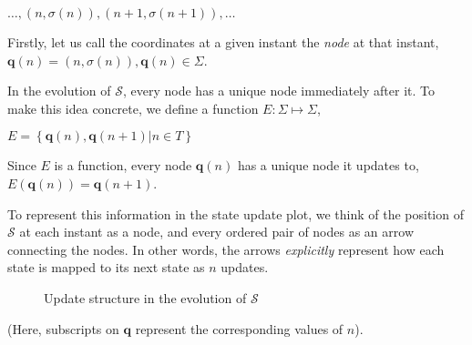 \documentclass[12 pt]{article}
\begin{document}
$\dots, \left( n, \sigma \left( n \right) \right), \left( n+1, \sigma \left( n+1 \right) \right), \dots$

Firstly, let us call the coordinates at a given instant the \emph{node} at that instant, $\pmb{q} \left( n \right) = \left( n, \sigma \left( n \right) \right), \pmb{q} \left( n \right) \in \Sigma$.

In the evolution of $\mathcal{S}$, every node has a unique node immediately after it. To make this idea concrete, we define a function $E : \Sigma \mapsto \Sigma$,

$E = \left\{ \pmb{q} \left( n \right), \pmb{q} \left( n+1 \right) \vert n \in T \right\}$

Since $E$ is a function, every node $\pmb{q} \left( n \right)$ has a unique node it updates to, $E \left( \pmb{q} \left( n \right) \right) = \pmb{q} \left( n+1 \right)$.

To represent this information in the state update plot, we think of the position of $\mathcal{S}$ at each instant as a node, and every ordered pair of nodes as an arrow connecting the nodes. In other words, the arrows \emph{explicitly} represent how each state is mapped to its next state as $n$ updates.

\clearpage

\begin{figure}[h]
\label{fig:2}
\centering
{}
\caption{Update structure in the evolution of $\mathcal{S}$}
\end{figure}

(Here, subscripts on $\pmb{q}$ represent the corresponding values of $n$).
\end{document}

